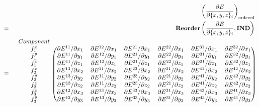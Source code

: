 \documentclass{article}
\begin{document}
\begin{eqnarray}
&& \left(
	\frac{\partial{E}}{\partial{\{x, y, z\}_i}}
\right)_{\mathrm{ordered}} \nonumber \\
& = &
\mathbf{Reorder}\left(
	\frac{\partial{E}}{\partial{\{x, y, z\}_i}}, \mathbf{IND}
\right) \nonumber \\
& = & \begin{blockarray}{ccccccc}
Component & & & & & & \\
\begin{block}{c(cccccc)}
f^x_1 &
\partial{E^{11}} / \partial{x_1} & \partial{E^{12}} / \partial{x_1} &
\partial{E^{21}} / \partial{x_1} & \partial{E^{22}} / \partial{x_1} &
\partial{E^{31}} / \partial{x_1} & \partial{E^{32}} / \partial{x_1} \\
f^y_1 &
\partial{E^{11}} / \partial{y_1} & \partial{E^{12}} / \partial{y_1} &
\partial{E^{21}} / \partial{y_1} & \partial{E^{22}} / \partial{y_1} &
\partial{E^{31}} / \partial{y_1} & \partial{E^{32}} / \partial{y_1} \\
f^z_1 &
\partial{E^{11}} / \partial{z_1} & \partial{E^{12}} / \partial{z_1} &
\partial{E^{21}} / \partial{z_1} & \partial{E^{22}} / \partial{z_1} &
\partial{E^{31}} / \partial{z_1} & \partial{E^{32}} / \partial{z_1} \\
%
f^x_2 &
\partial{E^{13}} / \partial{x_2} & \partial{E^{11}} / \partial{x_2} &
\partial{E^{23}} / \partial{x_2} & \partial{E^{21}} / \partial{x_2} &
\partial{E^{41}} / \partial{x_2} & \partial{E^{42}} / \partial{x_2} \\
f^y_2 &
\partial{E^{13}} / \partial{y_2} & \partial{E^{11}} / \partial{y_2} &
\partial{E^{23}} / \partial{y_2} & \partial{E^{21}} / \partial{y_2} &
\partial{E^{41}} / \partial{y_2} & \partial{E^{42}} / \partial{y_2} \\
f^z_2 &
\partial{E^{13}} / \partial{z_2} & \partial{E^{11}} / \partial{z_2} &
\partial{E^{23}} / \partial{z_2} & \partial{E^{21}} / \partial{z_2} &
\partial{E^{41}} / \partial{z_2} & \partial{E^{42}} / \partial{z_2} \\
%
f^x_3 &
\partial{E^{12}} / \partial{x_3} & \partial{E^{13}} / \partial{x_3} &
\partial{E^{33}} / \partial{x_3} & \partial{E^{31}} / \partial{x_3} &
\partial{E^{43}} / \partial{x_3} & \partial{E^{41}} / \partial{x_3} \\
f^y_3 &
\partial{E^{12}} / \partial{y_3} & \partial{E^{13}} / \partial{y_3} &
\partial{E^{33}} / \partial{y_3} & \partial{E^{31}} / \partial{y_3} &
\partial{E^{43}} / \partial{y_3} & \partial{E^{41}} / \partial{y_3} \\

\end{block}
\end{blockarray}
\end{eqnarray}
\end{document}

